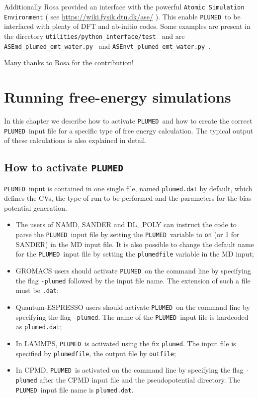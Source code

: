 \documentclass[12pt,fleqn]{report}
\newcommand{\plumed}{{\tt PLUMED}}
\begin{document}
Additionally Rosa provided an interface with the powerful {\tt Atomic Simulation Environment} ( see \url{https://wiki.fysik.dtu.dk/ase/} ). 
This enable \plumed\ to be interfaced with plenty of DFT and ab-initio codes.
Some examples are present in the directory {\tt utilities/python\_interface/test } and are {\tt ASEmd\_plumed\_emt\_water.py } and
{\tt ASEnvt\_plumed\_emt\_water.py }. 

Many thanks to Rosa for the contribution! 


\chapter{Running free-energy simulations}
\label{ch.running}
\label{ch.input}

In this chapter we describe how to activate \plumed \
and how to create the correct \plumed  \ input file for a specific type of free energy calculation.
The typical output of these calculations is also explained in detail.

\section{How to activate \plumed}

\plumed \ input is contained in one single file, named {\tt plumed.dat} by default, which defines the
CVs, the type of run to be performed and the parameters for the bias potential generation. 
\begin{itemize}
\item The users of NAMD, SANDER and DL\_POLY can instruct the code to parse the \plumed  \ input file by setting the
\plumed \ variable to {\tt on} (or 1 for SANDER) in the MD input file. It is also possible to change the default name
for the \plumed \ input file by setting the {\tt plumedfile} variable in the MD input;
\item GROMACS users should activate \plumed \ on the command line by specifying the flag {\tt -plumed}
followed by the input file name. The extension of such a file must be {\tt .dat};
\item Quantum-ESPRESSO users should activate \plumed \ on the command line by specifying the flag {\tt -plumed}.
The name of the \plumed \ input file is hardcoded as {\tt plumed.dat}; 
\item In LAMMPS, \plumed \ is activated using the fix {\tt plumed}. The input file is specified by  {\tt plumedfile},
the output file by {\tt outfile}; 
\item In CPMD, \plumed \ is activated on the command line by specifying the flag {\tt -plumed}
after the CPMD input file and the pseudopotential directory. The \plumed \  input file name is {\tt plumed.dat}.
\end{itemize}
\end{document}
